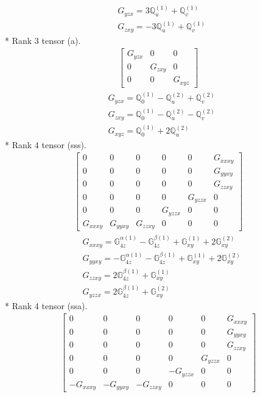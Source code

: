 \documentclass[fleqn,8pt,landscape]{jsarticle}
\begin{document}
\begin{align*}
& G_{yzx} = 3 \mathbb{Q}_{u}^{(1)} + \mathbb{Q}_{v}^{(1)} \\
& G_{zxy} = - 3 \mathbb{Q}_{u}^{(1)} + \mathbb{Q}_{v}^{(1)}
\end{align*}
* Rank 3 tensor (a).
\begin{align*}
\begin{bmatrix} G_{yzx} & 0 & 0 \\ 0 & G_{zxy} & 0 \\ 0 & 0 & G_{xyz} \end{bmatrix}
\end{align*}
\begin{align*}
& G_{yzx} = \mathbb{Q}_{0}^{(1)} - \mathbb{Q}_{u}^{(2)} + \mathbb{Q}_{v}^{(2)} \\
& G_{zxy} = \mathbb{Q}_{0}^{(1)} - \mathbb{Q}_{u}^{(2)} - \mathbb{Q}_{v}^{(2)} \\
& G_{xyz} = \mathbb{Q}_{0}^{(1)} + 2 \mathbb{Q}_{u}^{(2)}
\end{align*}
* Rank 4 tensor (sss).
\begin{align*}
\begin{bmatrix} 0 & 0 & 0 & 0 & 0 & G_{xxxy} \\ 0 & 0 & 0 & 0 & 0 & G_{yyxy} \\ 0 & 0 & 0 & 0 & 0 & G_{zzxy} \\ 0 & 0 & 0 & 0 & G_{yzzx} & 0 \\ 0 & 0 & 0 & G_{yzzx} & 0 & 0 \\ G_{xxxy} & G_{yyxy} & G_{zzxy} & 0 & 0 & 0 \end{bmatrix}
\end{align*}
\begin{align*}
& G_{xxxy} = \mathbb{G}_{4z}^{\alpha(1)} - \mathbb{G}_{4z}^{\beta(1)} + \mathbb{G}_{xy}^{(1)} + 2 \mathbb{G}_{xy}^{(2)} \\
& G_{yyxy} = - \mathbb{G}_{4z}^{\alpha(1)} - \mathbb{G}_{4z}^{\beta(1)} + \mathbb{G}_{xy}^{(1)} + 2 \mathbb{G}_{xy}^{(2)} \\
& G_{zzxy} = 2 \mathbb{G}_{4z}^{\beta(1)} + \mathbb{G}_{xy}^{(1)} \\
& G_{yzzx} = 2 \mathbb{G}_{4z}^{\beta(1)} + \mathbb{G}_{xy}^{(2)}
\end{align*}
* Rank 4 tensor (ssa).
\begin{align*}
\begin{bmatrix} 0 & 0 & 0 & 0 & 0 & G_{xxxy} \\ 0 & 0 & 0 & 0 & 0 & G_{yyxy} \\ 0 & 0 & 0 & 0 & 0 & G_{zzxy} \\ 0 & 0 & 0 & 0 & G_{yzzx} & 0 \\ 0 & 0 & 0 & - G_{yzzx} & 0 & 0 \\ - G_{xxxy} & - G_{yyxy} & - G_{zzxy} & 0 & 0 & 0 \end{bmatrix}
\end{align*}
\end{document}
